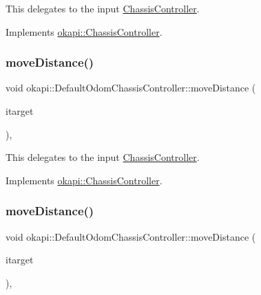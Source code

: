 This delegates to the input \mbox{\hyperlink{classokapi_1_1ChassisController}{Chassis\+Controller}}. 

Implements \mbox{\hyperlink{classokapi_1_1ChassisController_a239802eda7e4317a65d1a04994f7b97e}{okapi\+::\+Chassis\+Controller}}.

\mbox{\label{classokapi_1_1DefaultOdomChassisController_a3143bc60f72ab8ff8f63aad9a810a1c6}} 
\subsubsection{\texorpdfstring{moveDistance()}{moveDistance()}\hspace{0.1cm}{\footnotesize\ttfamily [1/2]}}
{\footnotesize\ttfamily void okapi\+::\+Default\+Odom\+Chassis\+Controller\+::move\+Distance (\begin{DoxyParamCaption}\item[{Q\+Length}]{itarget }\end{DoxyParamCaption})\hspace{0.3cm}{\ttfamily [override]}, {\ttfamily [virtual]}}

This delegates to the input \mbox{\hyperlink{classokapi_1_1ChassisController}{Chassis\+Controller}}. 

Implements \mbox{\hyperlink{classokapi_1_1ChassisController_a6d5b69139dfa8b814d05c74c22bcaa43}{okapi\+::\+Chassis\+Controller}}.

\mbox{\label{classokapi_1_1DefaultOdomChassisController_a42abd53b9a0b96b722186ada8eb13d98}} 
\subsubsection{\texorpdfstring{moveDistance()}{moveDistance()}\hspace{0.1cm}{\footnotesize\ttfamily [2/2]}}
{\footnotesize\ttfamily void okapi\+::\+Default\+Odom\+Chassis\+Controller\+::move\+Distance (\begin{DoxyParamCaption}\item[{double}]{itarget }\end{DoxyParamCaption})\hspace{0.3cm}{\ttfamily [override]}, {\ttfamily [virtual]}}

